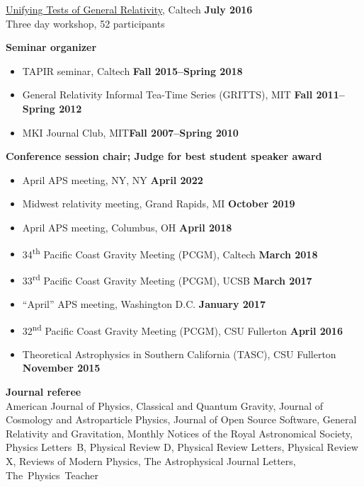 \documentclass[margin,line]{res}
\begin{document}
\begin{resume}
\begin{itemize}
  \href{http://www.tapir.caltech.edu/~unifying-gr-tests/}
  {Unifying Tests of General Relativity},
  Caltech \hfill {\bf July 2016} \\
\hspace*{1em} Three day workshop, 52 participants
\end{itemize}
{\bf Seminar organizer}
\vspace*{.05in}
\begin{itemize}
\item[] TAPIR seminar, Caltech\hfill
  {\bf Fall 2015--Spring 2018}
\item[] General Relativity Informal Tea-Time Series (GRITTS), MIT\hfill
  {\bf Fall 2011--Spring 2012}
\item[] MKI Journal Club, MIT\hfill {\bf Fall 2007--Spring 2010}
\end{itemize}
{\bf Conference session chair; Judge for best student speaker award}
\vspace*{.05in}
\begin{itemize}
\item[]
April APS meeting, NY, NY
\hfill {\bf April 2022}
\item[]
Midwest relativity meeting, Grand Rapids, MI
\hfill {\bf October 2019}
\item[]
April APS meeting, Columbus, OH
\hfill {\bf April 2018}
\item[]
34\textsuperscript{th} Pacific Coast Gravity Meeting (PCGM),
Caltech
\hfill {\bf March 2018}
\item[]
33\textsuperscript{rd} Pacific Coast Gravity Meeting (PCGM),
UCSB
\hfill {\bf March 2017}
\item[]
``April'' APS meeting, Washington D.C.
\hfill {\bf January 2017}
\item[]
32\textsuperscript{nd} Pacific Coast Gravity Meeting (PCGM),
CSU Fullerton
\hfill {\bf April 2016}
\item[]
Theoretical Astrophysics in Southern California (TASC),
CSU Fullerton
\hfill {\bf November 2015}
\end{itemize}

{\bf Journal referee}
\vspace*{.05in}\\
\hspace*{1em}
American Journal of Physics,
Classical and Quantum Gravity,
Journal of Cosmology and Astroparticle Physics,
Journal of Open Source Software,
General Relativity and Gravitation,
Monthly Notices of the Royal Astronomical Society,
Physics Letters~B,
Physical Review D,
Physical Review Letters,
Physical Review X,
Reviews of Modern Physics,
The Astrophysical Journal Letters,
The~Physics~Teacher


\end{resume}
\end{document}
